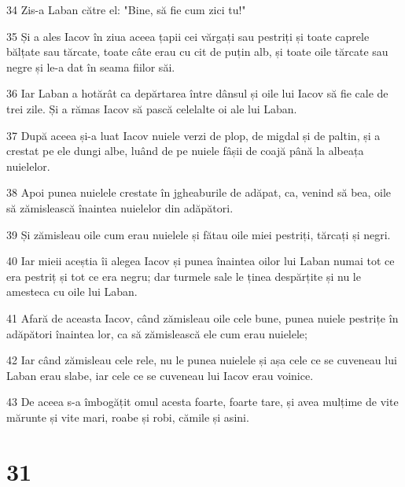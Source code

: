 \par 34 Zis-a Laban către el: "Bine, să fie cum zici tu!"
\par 35 Și a ales Iacov în ziua aceea țapii cei vărgați sau pestriți și toate caprele bălțate sau tărcate, toate câte erau cu cit de puțin alb, și toate oile tărcate sau negre și le-a dat în seama fiilor săi.
\par 36 Iar Laban a hotărât ca depărtarea între dânsul și oile lui Iacov să fie cale de trei zile. Și a rămas Iacov să pască celelalte oi ale lui Laban.
\par 37 După aceea și-a luat Iacov nuiele verzi de plop, de migdal și de paltin, și a crestat pe ele dungi albe, luând de pe nuiele fâșii de coajă până la albeața nuielelor.
\par 38 Apoi punea nuielele crestate în jgheaburile de adăpat, ca, venind să bea, oile să zămislească înaintea nuielelor din adăpători.
\par 39 Și zămisleau oile cum erau nuielele și fătau oile miei pestriți, tărcați și negri.
\par 40 Iar mieii aceștia îi alegea Iacov și punea înaintea oilor lui Laban numai tot ce era pestriț și tot ce era negru; dar turmele sale le ținea despărțite și nu le amesteca cu oile lui Laban.
\par 41 Afară de aceasta Iacov, când zămisleau oile cele bune, punea nuiele pestrițe în adăpători înaintea lor, ca să zămislească ele cum erau nuielele;
\par 42 Iar când zămisleau cele rele, nu le punea nuielele și așa cele ce se cuveneau lui Laban erau slabe, iar cele ce se cuveneau lui Iacov erau voinice.
\par 43 De aceea s-a îmbogățit omul acesta foarte, foarte tare, și avea mulțime de vite mărunte și vite mari, roabe și robi, cămile și asini.

\chapter{31}

